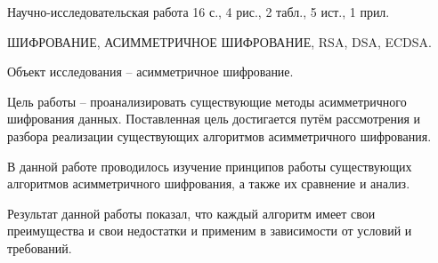 
Научно-исследовательская работа 16 с., 4 рис., 2 табл., 5 ист., 1 прил.

ШИФРОВАНИЕ, АСИММЕТРИЧНОЕ ШИФРОВАНИЕ, RSA, DSA, ECDSA.

Объект исследования -- асимметричное шифрование.

Цель работы -- проанализировать существующие методы асимметричного шифрования данных. Поставленная цель достигается путём рассмотрения и разбора реализации существующих алгоритмов асимметричного шифрования.

В данной работе проводилось изучение принципов работы существующих алгоритмов асимметричного шифрования, а также их сравнение и анализ.

Результат данной работы показал, что каждый алгоритм имеет свои преимущества и свои недостатки и применим в зависимости от условий и требований.
